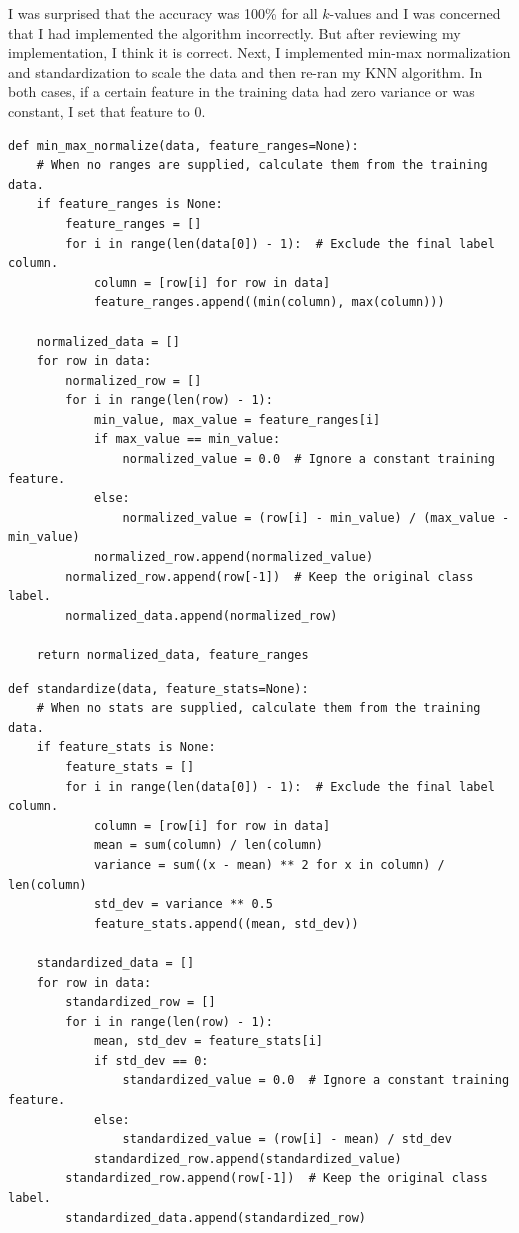 \documentclass[12pt]{article}
\begin{document}
\begin{enumerate}
I was surprised that the accuracy was 100\% for all $k$-values and I was concerned that I had implemented the algorithm incorrectly. But after reviewing my implementation, I think it is correct. 
Next, I implemented min-max normalization and standardization to scale the data and then re-ran my KNN algorithm. In both cases, if a certain feature in the training data had zero variance or was constant, I set that feature to 0. 



\newpage
\begin{lstlisting}[basicstyle=\ttfamily\fontsize{9}{10.5}\selectfont]
def min_max_normalize(data, feature_ranges=None):
    # When no ranges are supplied, calculate them from the training data.
    if feature_ranges is None:
        feature_ranges = []
        for i in range(len(data[0]) - 1):  # Exclude the final label column.
            column = [row[i] for row in data]
            feature_ranges.append((min(column), max(column)))

    normalized_data = []
    for row in data:
        normalized_row = []
        for i in range(len(row) - 1):
            min_value, max_value = feature_ranges[i]
            if max_value == min_value:
                normalized_value = 0.0  # Ignore a constant training feature.
            else:
                normalized_value = (row[i] - min_value) / (max_value - min_value)
            normalized_row.append(normalized_value)
        normalized_row.append(row[-1])  # Keep the original class label.
        normalized_data.append(normalized_row)

    return normalized_data, feature_ranges
\end{lstlisting}

\begin{lstlisting}[basicstyle=\ttfamily\fontsize{9}{10.5}\selectfont]
def standardize(data, feature_stats=None):
    # When no stats are supplied, calculate them from the training data.
    if feature_stats is None:
        feature_stats = []
        for i in range(len(data[0]) - 1):  # Exclude the final label column.
            column = [row[i] for row in data]
            mean = sum(column) / len(column)
            variance = sum((x - mean) ** 2 for x in column) / len(column)
            std_dev = variance ** 0.5
            feature_stats.append((mean, std_dev))

    standardized_data = []
    for row in data:
        standardized_row = []
        for i in range(len(row) - 1):
            mean, std_dev = feature_stats[i]
            if std_dev == 0:
                standardized_value = 0.0  # Ignore a constant training feature.
            else:
                standardized_value = (row[i] - mean) / std_dev
            standardized_row.append(standardized_value)
        standardized_row.append(row[-1])  # Keep the original class label.
        standardized_data.append(standardized_row)


\end{lstlisting}
\end{enumerate}
\end{document}
